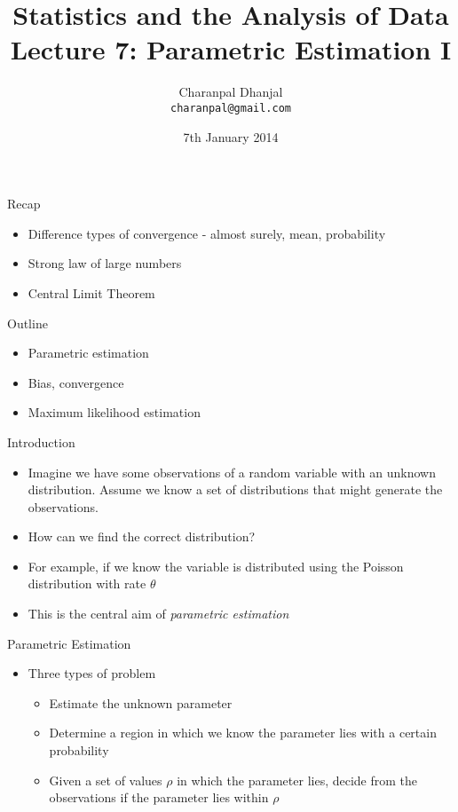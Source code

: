 \documentclass{beamer}
\title{Statistics and the Analysis of Data\\ Lecture 7: Parametric Estimation I}
\author{Charanpal Dhanjal \\ \texttt{charanpal@gmail.com}}
\institute{\'{E}cole des Ponts}
\date{7th January 2014}
\begin{document}
\frame{\titlepage}

\begin{frame}{Recap}  
\begin{itemize} 
\item Difference types of convergence - almost surely, mean, probability 
\item Strong law of large numbers 
\item Central Limit Theorem 
\end{itemize}
\end{frame}

\begin{frame}{Outline}  
\begin{itemize} 
 \item Parametric estimation 
 \item Bias, convergence
 \item Maximum likelihood estimation
\end{itemize}
\end{frame}

\begin{frame}{Introduction}
\begin{itemize}
 \item Imagine we have some observations of a random variable with an unknown distribution. Assume we know a set of distributions that might generate the observations. 
 \item How can we find the correct distribution? 
 \item For example, if we know the variable is distributed using the Poisson distribution with rate $\theta$ 
 \item This is the central aim of \emph{parametric estimation}
\end{itemize}
\end{frame}

\begin{frame}{Parametric Estimation} 
\begin{itemize} 
 \item Three types of problem 
 \begin{itemize} 
 \item Estimate the unknown parameter 
 \item Determine a region in which we know the parameter lies with a certain probability 
 \item Given a set of values $\rho$ in which the parameter lies, decide from the observations if the parameter lies within $\rho$ 
 \end{itemize} 
\end{itemize}
\end{frame}
\end{document}
